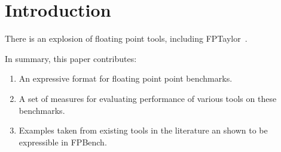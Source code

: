 \documentclass[main.tex]{subfiles}
\begin{document}
\section{Introduction}
\label{sec:intro}

There is an explosion of floating point tools, including
FPTaylor~\cite{fptaylor-fm15}.

In summary, this paper contributes:
%
\begin{enumerate}
%
  \item An expressive format for floating point point benchmarks.
%
  \item A set of measures for evaluating performance of various tools on
  these benchmarks.
%
  \item Examples taken from existing tools in the literature an shown to be
  expressible in FPBench.
%
\end{enumerate}
\end{document}
